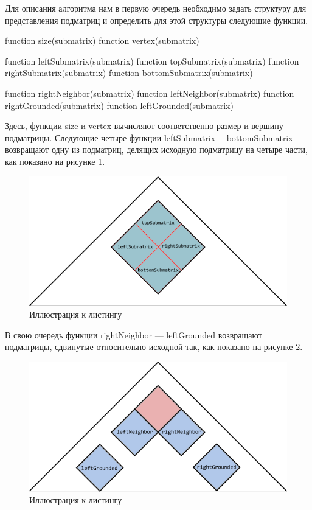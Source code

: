 \documentclass[12pt]{article}  %
\theoremstyle{definition}
\theoremstyle{remark}
\begin{document}
Для описания алгоритма нам в первую очередь необходимо задать структуру для представления подматриц и определить для этой структуры следующие функции.

\begin{algorithm}[caption={Submatrix helpers.}, label={helpers}]
function size(submatrix)
function vertex(submatrix)

function leftSubmatrix(submatrix)
function topSubmatrix(submatrix)
function rightSubmatrix(submatrix)
function bottomSubmatrix(submatrix)

function rightNeighbor(submatrix)
function leftNeighbor(submatrix)
function rightGrounded(submatrix)
function leftGrounded(submatrix)     
\end{algorithm}

Здесь, функции size и vertex вычисляют соответственно размер и вершину подматрицы. Следующие четыре функции leftSubmatrix ---\linebreak bottomSubmatrix возвращают одну из подматриц, делящих исходную подматрицу на четыре части, как показано на рисунке \ref{gr:inner}.


\begin{figure}[!ht]
  \caption{Иллюстрация к листингу}
  \label{gr:inner}
  \centering
    \includegraphics[width=0.9\linewidth]{inner.png}
\end{figure}

\pagebreak

В свою очередь функции rightNeighbor --- leftGrounded возвращают подматрицы, сдвинутые относительно исходной так, как показано на рисунке \ref{gr:outer}.

\begin{figure}[!ht]
  \caption{Иллюстрация к листингу}
  \label{gr:outer}
  \centering
    \includegraphics[width=0.9\linewidth]{outer.png}
\end{figure}
\end{document}
